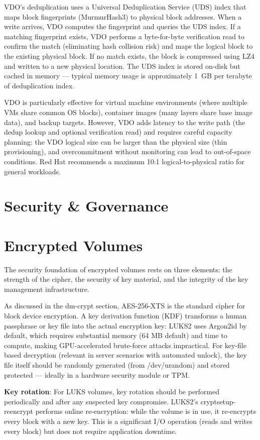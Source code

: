 VDO's deduplication uses a Universal Deduplication Service (UDS) index that maps block fingerprints (MurmurHash3) to physical block addresses. When a write arrives, VDO computes the fingerprint and queries the UDS index. If a matching fingerprint exists, VDO performs a byte-for-byte verification read to confirm the match (eliminating hash collision risk) and maps the logical block to the existing physical block. If no match exists, the block is compressed using LZ4 and written to a new physical location. The UDS index is stored on-disk but cached in memory --- typical memory usage is approximately 1~GB per terabyte of deduplication index.

VDO is particularly effective for virtual machine environments (where multiple VMs share common OS blocks), container images (many layers share base image data), and backup targets. However, VDO adds latency to the write path (the dedup lookup and optional verification read) and requires careful capacity planning: the VDO logical size can be larger than the physical size (thin provisioning), and overcommitment without monitoring can lead to out-of-space conditions. Red Hat recommends a maximum 10:1 logical-to-physical ratio for general workloads.


\section{Security \& Governance}
\section{Encrypted Volumes}
The security foundation of encrypted volumes rests on three elements: the strength of the cipher, the security of key material, and the integrity of the key management infrastructure.

As discussed in the dm-crypt section, AES-256-XTS is the standard cipher for block device encryption. A key derivation function (KDF) transforms a human passphrase or key file into the actual encryption key: LUKS2 uses Argon2id by default, which requires substantial memory (64 MB default) and time to compute, making GPU-accelerated brute-force attacks impractical. For key-file based decryption (relevant in server scenarios with automated unlock), the key file itself should be randomly generated (from /dev/urandom) and stored protected --- ideally in a hardware security module or TPM.

\textbf{Key rotation}: For LUKS volumes, key rotation should be performed periodically and after any suspected key compromise. LUKS2's cryptsetup-reencrypt performs online re-encryption: while the volume is in use, it re-encrypts every block with a new key. This is a significant I/O operation (reads and writes every block) but does not require application downtime.


